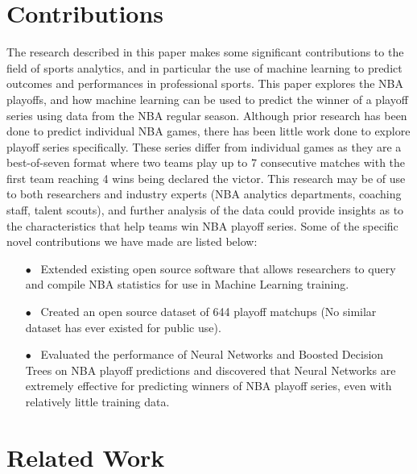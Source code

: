 \documentclass[letterpaper]{article} %
\begin{document}
\section{Contributions}

The research described in this paper makes some significant contributions to the field of sports analytics, and in particular the use of machine learning to predict outcomes and performances in professional sports. This paper explores the NBA playoffs, and how machine learning can be used to predict the winner of a playoff series using data from the NBA regular season. Although prior research has been done to predict individual NBA games, there has been little work done to explore playoff series specifically.  These series differ from individual games as they are a best-of-seven format where two teams play up to 7 consecutive matches with the first team reaching 4 wins being declared the victor. This research may be of use to both researchers and industry experts (NBA analytics departments, coaching staff, talent scouts), and further analysis of the data could provide insights as to the characteristics that help teams win NBA playoff series. Some of the specific novel contributions we have made are listed below:
\begin{itemize}
\item[$\bullet$~]Extended existing open source software that allows researchers to query and compile NBA statistics for use in Machine Learning training.
\item[$\bullet$~]Created an open source dataset of 644 playoff matchups (No similar dataset has ever existed for public use).
\item[$\bullet$~]Evaluated the performance of Neural Networks and Boosted Decision Trees on NBA playoff predictions and discovered that Neural Networks are extremely effective for predicting winners of NBA playoff series, even with relatively little training data.
\end{itemize}


\section{Related Work}
\end{document}
